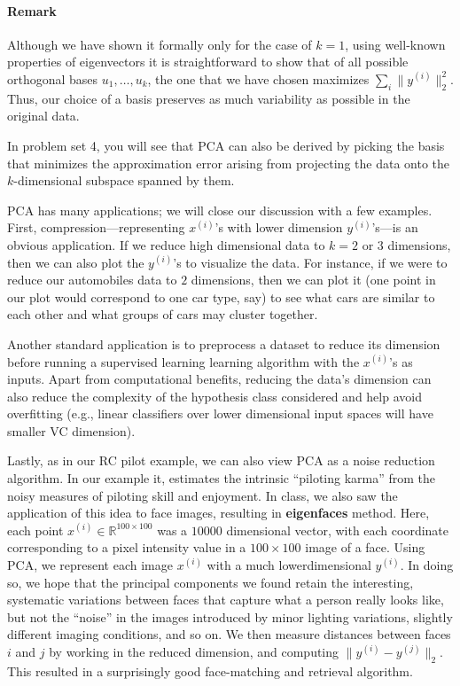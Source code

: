 \paragraph{Remark} Although we have shown it formally only for the case of $k = 1$,
using well-known properties of eigenvectors it is straightforward to show that
of all possible orthogonal bases $u_1, \ldots, u_k$, the one that we have chosen maximizes $\sum_i \lVert y^{(i)} \rVert_2^2$. Thus, our choice of a basis preserves as much variability
as possible in the original data.

In problem set 4, you will see that PCA can also be derived by picking
the basis that minimizes the approximation error arising from projecting the
data onto the $k$-dimensional subspace spanned by them.

PCA has many applications; we will close our discussion with a few examples. First, compression---representing $x^{(i)}$'s with lower dimension $y^{(i)}$'s---is an
obvious application. If we reduce high dimensional data to $k = 2$ or $3$ dimensions, then we can also plot the $y^{(i)}$'s to visualize the data. For instance,
if we were to reduce our automobiles data to $2$ dimensions, then we can plot
it (one point in our plot would correspond to one car type, say) to see what
cars are similar to each other and what groups of cars may cluster together.

Another standard application is to preprocess a dataset to reduce its
dimension before running a supervised learning learning algorithm with the
$x^{(i)}$'s as inputs. Apart from computational benefits, reducing the data's
dimension can also reduce the complexity of the hypothesis class considered
and help avoid overfitting (e.g., linear classifiers over lower dimensional input
spaces will have smaller VC dimension).

Lastly, as in our RC pilot example, we can also view PCA as a noise
reduction algorithm. In our example it, estimates the intrinsic ``piloting
karma'' from the noisy measures of piloting skill and enjoyment. In class, we
also saw the application of this idea to face images, resulting in \textbf{eigenfaces}
method. Here, each point $x^{(i)} \in \mathbb R^{100 \times 100}$ was a $10000$ dimensional vector,
with each coordinate corresponding to a pixel intensity value in a $100\times100$
image of a face. Using PCA, we represent each image $x^{(i)}$ with a much lowerdimensional $y^{(i)}$.
In doing so, we hope that the principal components we
found retain the interesting, systematic variations between faces that capture
what a person really looks like, but not the ``noise'' in the images introduced
by minor lighting variations, slightly different imaging conditions, and so on.
We then measure distances between faces $i$ and $j$ by working in the reduced
dimension, and computing $\lVert y^{(i)} - y^{(j)} \rVert_2$. This resulted in a surprisingly good
face-matching and retrieval algorithm.
